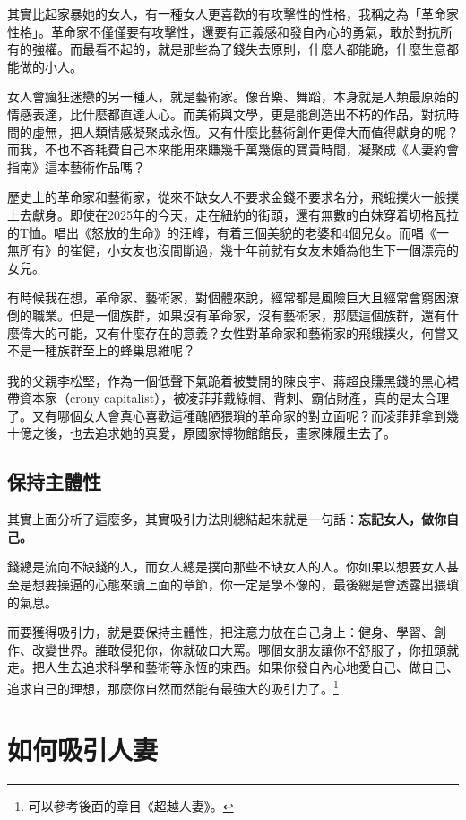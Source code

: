 其實比起家暴她的女人，有一種女人更喜歡的有攻擊性的性格，我稱之為「革命家性格」。革命家不僅僅要有攻擊性，還要有正義感和發自內心的勇氣，敢於對抗所有的強權。而最看不起的，就是那些為了錢失去原則，什麼人都能跪，什麼生意都能做的小人。

女人會瘋狂迷戀的另一種人，就是藝術家。像音樂、舞蹈，本身就是人類最原始的情感表達，比什麼都直達人心。而美術與文學，更是能創造出不朽的作品，對抗時間的虛無，把人類情感凝聚成永恆。又有什麼比藝術創作更偉大而值得獻身的呢？而我，不也不吝耗費自己本來能用來賺幾千萬幾億的寶貴時間，凝聚成《人妻約會指南》這本藝術作品嗎？

歷史上的革命家和藝術家，從來不缺女人不要求金錢不要求名分，飛蛾撲火一般撲上去獻身。即使在2025年的今天，走在紐約的街頭，還有無數的白妹穿着切格瓦拉的T恤。唱出《怒放的生命》的汪峰，有着三個美貌的老婆和4個兒女。而唱《一無所有》的崔健，小女友也沒間斷過，幾十年前就有女友未婚為他生下一個漂亮的女兒。

有時候我在想，革命家、藝術家，對個體來說，經常都是風險巨大且經常會窮困潦倒的職業。但是一個族群，如果沒有革命家，沒有藝術家，那麼這個族群，還有什麼偉大的可能，又有什麼存在的意義？女性對革命家和藝術家的飛蛾撲火，何嘗又不是一種族群至上的蜂巢思維呢？

我的父親李松堅，作為一個低聲下氣跪着被雙開的陳良宇、蔣超良賺黑錢的黑心裙帶資本家（crony capitalist），被凌菲菲戴綠帽、背刺、霸佔財產，真的是太合理了。又有哪個女人會真心喜歡這種醜陋猥瑣的革命家的對立面呢？而凌菲菲拿到幾十億之後，也去追求她的真愛，原國家博物館館長，畫家陳履生去了。

\subsection{保持主體性}

其實上面分析了這麼多，其實吸引力法則總結起來就是一句話：\textbf{忘記女人，做你自己。}

錢總是流向不缺錢的人，而女人總是撲向那些不缺女人的人。你如果以想要女人甚至是想要操逼的心態來讀上面的章節，你一定是學不像的，最後總是會透露出猥瑣的氣息。

而要獲得吸引力，就是要保持主體性，把注意力放在自己身上：健身、學習、創作、改變世界。誰敢侵犯你，你就破口大罵。哪個女朋友讓你不舒服了，你扭頭就走。把人生去追求科學和藝術等永恆的東西。如果你發自內心地愛自己、做自己、追求自己的理想，那麼你自然而然能有最強大的吸引力了。\footnote{可以參考後面的章目《超越人妻》。}

\section{如何吸引人妻}

